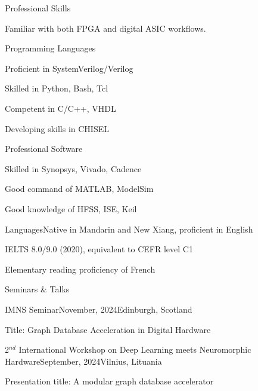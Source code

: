 \documentclass{resume} %
\begin{document}
\begin{rSection}{Professional Skills}

	Familiar with both FPGA and digital ASIC workflows. 
	
	\begin{rSubsection}{Programming Languages}{}{}{}
		\item Proficient in SystemVerilog/Verilog
		\item Skilled in Python, Bash, Tcl
		\item Competent in C/C++, VHDL
		\item Developing skills in CHISEL
	\end{rSubsection}

	\begin{rSubsection}{Professional Software}{}{}{}
		\item Skilled in Synopsys, Vivado, Cadence
		\item Good command of MATLAB, ModelSim
		\item Good knowledge of HFSS, ISE, Keil
	\end{rSubsection}

	\begin{rSubsection}{Languages}{}{Native in Mandarin and New Xiang, proficient in English}{}
		\item IELTS 8.0/9.0 (2020), equivalent to CEFR level C1
		\item Elementary reading proficiency of French
	\end{rSubsection}

\end{rSection}

\newpage

\begin{rSection}{Seminars \& Talks}
	
	\begin{rSubsection}{IMNS Seminar}{November, 2024}{Edinburgh, Scotland}
		\item Title: Graph Database Acceleration in Digital Hardware
	\end{rSubsection}
	
	\begin{rSubsection}{2$^{nd}$ International Workshop on Deep Learning meets Neuromorphic\\Hardware}{September, 2024}{Vilnius, Lituania}
		\item Presentation title: A modular graph database accelerator
	\end{rSubsection}
	
\end{rSection}
\end{document}
